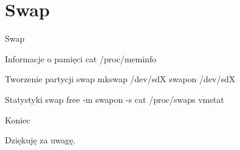 \documentclass[xcolor=dvipsnames]{beamer}
\begin{document}
\section{Swap}
\begin{frame}{Swap}
\begin{block}{Informacje o pamięci}
cat /proc/meminfo
\end{block}
\pause
\begin{block}{Tworzenie partycji swap}
mkswap /dev/sdX
\newline
swapon /dev/sdX
\end{block}
\pause
\begin{block}{Statystyki swap}
free -m
\newline
swapon -s
\newline
cat /proc/swaps
\newline
vmstat
\end{block}
\end{frame}
\begin{frame}{Koniec}
\begin{center}
Dziękuję za uwagę.
\end{center}
\end{frame}
\end{document}
